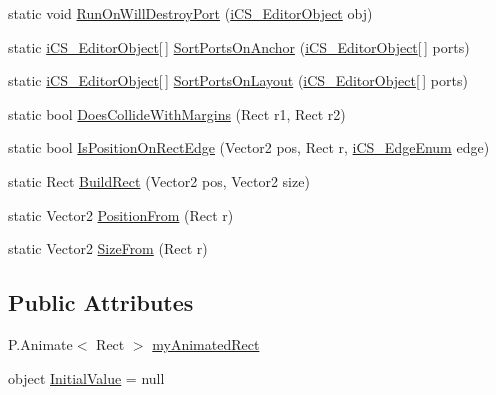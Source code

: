 \begin{DoxyCompactItemize}
\item 
static void \hyperlink{classi_c_s___editor_object_a1792e6d864e09cca41811b994ea384b0}{Run\+On\+Will\+Destroy\+Port} (\hyperlink{classi_c_s___editor_object}{i\+C\+S\+\_\+\+Editor\+Object} obj)
\item 
static \hyperlink{classi_c_s___editor_object}{i\+C\+S\+\_\+\+Editor\+Object}\mbox{[}$\,$\mbox{]} \hyperlink{classi_c_s___editor_object_a23e3e025b0df6e15f78de36e87a59d30}{Sort\+Ports\+On\+Anchor} (\hyperlink{classi_c_s___editor_object}{i\+C\+S\+\_\+\+Editor\+Object}\mbox{[}$\,$\mbox{]} ports)
\item 
static \hyperlink{classi_c_s___editor_object}{i\+C\+S\+\_\+\+Editor\+Object}\mbox{[}$\,$\mbox{]} \hyperlink{classi_c_s___editor_object_a5fd85702e55070549522dff7135059ce}{Sort\+Ports\+On\+Layout} (\hyperlink{classi_c_s___editor_object}{i\+C\+S\+\_\+\+Editor\+Object}\mbox{[}$\,$\mbox{]} ports)
\item 
static bool \hyperlink{classi_c_s___editor_object_a8b61f8bda0671a95da6f062cf00b55c1}{Does\+Collide\+With\+Margins} (Rect r1, Rect r2)
\item 
static bool \hyperlink{classi_c_s___editor_object_a7b3f3072e15ab4e228a684a5c9f31199}{Is\+Position\+On\+Rect\+Edge} (Vector2 pos, Rect r, \hyperlink{i_c_s___edge_enum_8cs_af0c43d9550817659c245d5d49fbb4771}{i\+C\+S\+\_\+\+Edge\+Enum} edge)
\item 
static Rect \hyperlink{classi_c_s___editor_object_a01814846e79d28fcc3e30c4c845e466b}{Build\+Rect} (Vector2 pos, Vector2 size)
\item 
static Vector2 \hyperlink{classi_c_s___editor_object_aeada7ad1999a8133e157abb54a6cf459}{Position\+From} (Rect r)
\item 
static Vector2 \hyperlink{classi_c_s___editor_object_a94cbbb7ff8b6effcd97be52c7f6d8b2a}{Size\+From} (Rect r)
\end{DoxyCompactItemize}
\subsection*{Public Attributes}
\begin{DoxyCompactItemize}
\item 
P.\+Animate$<$ Rect $>$ \hyperlink{classi_c_s___editor_object_a0c91e1ff33d1dcba3c3b925564aa8eff}{my\+Animated\+Rect}
\item 
object \hyperlink{classi_c_s___editor_object_a9112f3333eaf4bbdc11b924bff6038eb}{Initial\+Value} = null
\end{DoxyCompactItemize}
